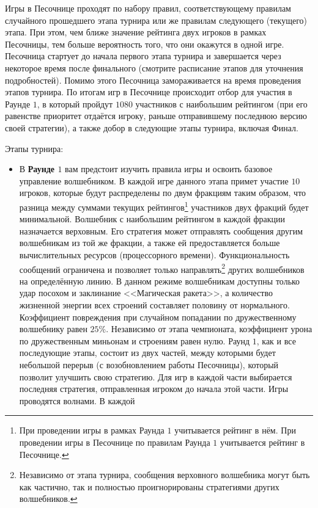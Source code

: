 Игры в Песочнице проходят по набору правил, соответствующему правилам случайного прошедшего этапа турнира или же правилам следующего
(текущего) этапа. При этом, чем ближе значение рейтинга двух игроков в рамках Песочницы, тем больше вероятность того, что они окажутся в
одной игре. Песочница стартует до начала первого этапа турнира и завершается через некоторое время после финального (смотрите расписание
этапов для уточнения подробностей). Помимо этого Песочница замораживается на время проведения этапов турнира. По итогам игр в Песочнице
происходит отбор для участия в Раунде $1$, в который пройдут $1080$ участников с наибольшим рейтингом (при его равенстве приоритет отдаётся
игроку, раньше отправившему последнюю версию своей стратегии), а также добор в следующие этапы турнира, включая Финал.

Этапы турнира:
\begin{itemize}
  \item В \textbf{Раунде $1$} вам предстоит изучить правила игры и освоить базовое управление волшебником. В каждой игре данного этапа
        примет участие $10$ игроков, которые будут распределены по двум фракциям таким образом, что разница между суммами текущих
        рейтингов\footnote[1]{При проведении игры в рамках Раунда $1$ учитывается рейтинг в нём. При проведении игры в Песочнице по правилам
        Раунда $1$ учитывается рейтинг в Песочнице.} участников двух фракций будет минимальной. Волшебник с наибольшим рейтингом в каждой
        фракции назначается верховным. Его стратегия может отправлять сообщения другим волшебникам из той же фракции, а также ей
        предоставляется больше вычислительных ресурсов (процессорного времени). Функциональность сообщений ограничена и позволяет только
        направлять\footnote[2]{Независимо от этапа турнира, сообщения верховного волшебника могут быть как частично, так и полностью
        проигнорированы стратегиями других волшебников.} других волшебников на определённую линию. В данном режиме волшебникам доступны
        только удар посохом и заклинание <<Магическая ракета>>, а количество жизненной энергии всех строений составляет половину от
        нормального. Коэффициент повреждения при случайном попадании по дружественному волшебнику равен $25\%$. Независимо от этапа
        чемпионата, коэффициент урона по дружественным миньонам и строениям равен нулю. Раунд $1$, как и все последующие этапы, состоит из
        двух частей, между которыми будет небольшой перерыв (с возобновлением работы Песочницы), который позволит улучшить свою стратегию.
        Для игр в каждой части выбирается последняя стратегия, отправленная игроком до начала этой части. Игры проводятся волнами. В каждой

\end{itemize}
